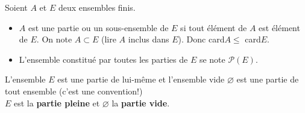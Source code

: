 \begin{definition}
Soient $A $ et $ E$ deux ensembles finis.
\begin{itemize}
\item $ A $ est une partie ou  un sous-ensemble de $ E $ si tout élément de $ A $ est élément de $ E. $  On note $ A \subset E $ (lire $ A$ inclus dans $E $). Donc  card$A \leq $ card$ E $.
\item L'ensemble constitué par toutes les parties de $ E $ se note  $ \mathcal{P}(E) $.
\end{itemize}
\end{definition}
\begin{remark}
L'ensemble $ E $ est une partie de lui-même et l'ensemble vide $ \varnothing $ est une partie de tout ensemble (c'est une convention!)\\
$ E $ est la  \textbf{partie pleine} et $ \varnothing $ la \textbf{ partie vide}.
\end{remark}



